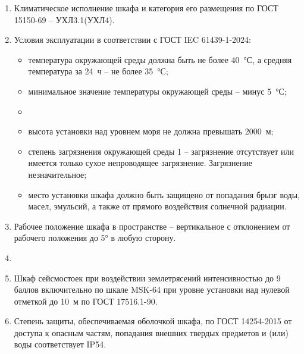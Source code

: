 \begin{enumerate}[label=\arabic{section}.\arabic{subsection}.\arabic{subsubsection}.\arabic*, align=left, labelsep=4pt, leftmargin=0pt, itemindent=2cm]

\item
Климатическое исполнение шкафа и категория его размещения по ГОСТ 15150-69 – УХЛ3.1(УХЛ4).

\item
Условия эксплуатации в соответствии с ГОСТ IEC 61439-1-2024:
\begin{itemize}
\item температура окружающей среды должна быть не более 40~°С, а средняя температура за 24~ч -- не более 35~°С;
\item минимальное значение температуры окружающей среды -- минус 5~°С;
\item {}
\item высота установки над уровнем моря не должна превышать 2000~м;
\item степень загрязнения окружающей среды 1 -- загрязнение отсутствует или имеется только сухое непроводящее загрязнение. Загрязнение незначительное;
\item место установки шкафа должно быть защищено от попадания брызг воды, масел, эмульсий, а также от прямого воздействия солнечной радиации.
\end{itemize}

\item
Рабочее положение шкафа в пространстве -- вертикальное с отклонением от рабочего положения до 5° в любую сторону.

\item
{}

\item
Шкаф сейсмостоек при воздействии землетрясений интенсивностью до 9 баллов включительно по шкале MSK-64 при уровне установки над нулевой отметкой до 10~м по ГОСТ 17516.1-90.

\item
Степень защиты, обеспечиваемая оболочкой шкафа, по ГОСТ 14254-2015 от доступа к опасным частям, попадания внешних твердых предметов и (или) воды соответствует IP54.

\end{enumerate}

